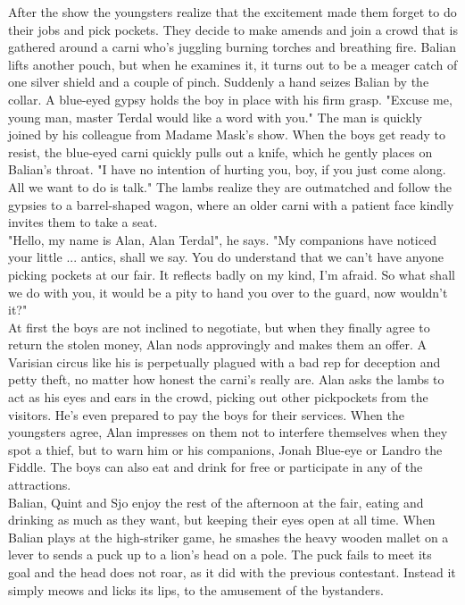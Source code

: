 After the show the youngsters realize that the excitement made them forget to do their jobs and pick pockets. They decide to make amends and join a crowd that is gathered around a carni who's juggling burning torches and breathing fire. Balian lifts another pouch, but when he examines it, it turns out to be a meager catch of one silver shield and a couple of pinch. Suddenly a hand seizes Balian by the collar. A blue-eyed gypsy holds the boy in place with his firm grasp. "Excuse me, young man, master Terdal would like a word with you." The man is quickly joined by his colleague from Madame Mask's show. When the boys get ready to resist, the blue-eyed carni quickly pulls out a knife, which he gently places on Balian's throat. "I have no intention of hurting you, boy, if you just come along. All we want to do is talk." The lambs realize they are outmatched and follow the gypsies to a barrel-shaped wagon, where an older carni with a patient face kindly invites them to take a seat.\\

"Hello, my name is Alan, Alan Terdal", he says. "My companions have noticed your little ... antics, shall we say. You do understand that we can't have anyone picking pockets at our fair. It reflects badly on my kind, I'm afraid. So what shall we do with you, it would be a pity to hand you over to the guard, now wouldn't it?"\\

At first the boys are not inclined to negotiate, but when they finally agree to return the stolen money, Alan nods approvingly and makes them an offer. A Varisian circus like his is perpetually plagued with a bad rep for deception and petty theft, no matter how honest the carni's really are. Alan asks the lambs to act as his eyes and ears in the crowd, picking out other pickpockets from the visitors. He's even prepared to pay the boys for their services. When the youngsters agree, Alan impresses on them not to interfere themselves when they spot a thief, but to warn him or his companions, Jonah Blue-eye or Landro the Fiddle. The boys can also eat and drink for free or participate in any of the attractions.\\

Balian, Quint and Sjo enjoy the rest of the afternoon at the fair, eating and drinking as much as they want, but keeping their eyes open at all time. When Balian plays at the high-striker game, he smashes the heavy wooden mallet on a lever to sends a puck up to a lion's head on a pole. The puck fails to meet its goal and the head does not roar, as it did with the previous contestant. Instead it simply meows and licks its lips, to the amusement of the bystanders.\\

